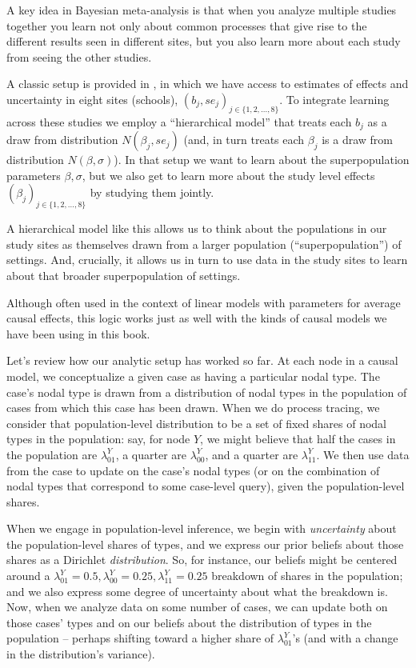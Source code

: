 \documentclass[
  12pt,
]{book}
\begin{document}
A key idea in Bayesian meta-analysis is that when you analyze multiple studies together you learn not only about common processes that give rise to the different results seen in different sites, but you also learn more about each study from seeing the other studies.

A classic setup is provided in \citet{gelman2013bayesian}, in which we have access to estimates of effects and uncertainty in eight sites (schools), \((b_j, se_j)_{j \in \{1,2,\dots,8\}}\). To integrate learning across these studies we employ a ``hierarchical model''
that treats each \(b_j\) as a draw from distribution \(N(\beta_j, se_j)\) (and, in turn treats each \(\beta_j\) is a draw from distribution \(N(\beta, \sigma)\)). In that setup we want to learn about the superpopulation parameters \(\beta, \sigma\), but we also get to learn more about the study level effects \((\beta_j)_{j \in \{1,2,\dots,8\}}\) by studying them jointly.

A hierarchical model like this allows us to think about the populations in our study sites as themselves drawn from a larger population (``superpopulation'') of settings. And, crucially, it allows us in turn to use data in the study sites to learn about that broader superpopulation of settings.

Although often used in the context of linear models with parameters for average causal effects, this logic works just as well with the kinds of causal models we have been using in this book.

Let's review how our analytic setup has worked so far. At each node in a causal model, we conceptualize a given case as having a particular nodal type. The case's nodal type is drawn from a distribution of nodal types in the population of cases from which this case has been drawn. When we do process tracing, we consider that population-level distribution to be a set of fixed shares of nodal types in the population: say, for node \(Y\), we might believe that half the cases in the population are \(\lambda^Y_{01}\), a quarter are \(\lambda^Y_{00}\), and a quarter are \(\lambda^Y_{11}\). We then use data from the case to update on the case's nodal types (or on the combination of nodal types that correspond to some case-level query), given the population-level shares.

When we engage in population-level inference, we begin with \emph{uncertainty} about the population-level shares of types, and we express our prior beliefs about those shares as a Dirichlet \emph{distribution}. So, for instance, our beliefs might be centered around a \(\lambda^Y_{01}=0.5, \lambda^Y_{00}=0.25, \lambda^Y_{11}=0.25\) breakdown of shares in the population; and we also express some degree of uncertainty about what the breakdown is. Now, when we analyze data on some number of cases, we can update both on those cases' types and on our beliefs about the distribution of types in the population -- perhaps shifting toward a higher share of \(\lambda^Y_{01}\)'s (and with a change in the distribution's variance).
\end{document}
